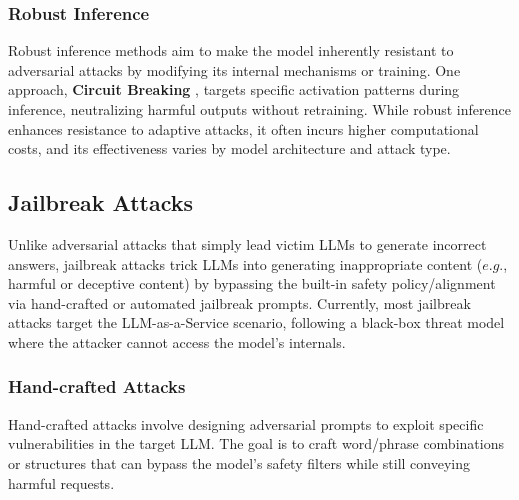 \subsubsection{Robust Inference}
Robust inference methods aim to make the model inherently resistant to adversarial attacks by modifying its internal mechanisms or training. One approach, \textbf{Circuit Breaking} \cite{zou2024improving}, targets specific activation patterns during inference, neutralizing harmful outputs without retraining. While robust inference enhances resistance to adaptive attacks, it often incurs higher computational costs, and its effectiveness varies by model architecture and attack type.

\subsection{Jailbreak Attacks}
\label{sec:llm_jailbreak_attacks}


Unlike adversarial attacks that simply lead victim LLMs to generate incorrect answers, jailbreak attacks trick LLMs into generating inappropriate content ($e.g.$, harmful or deceptive content) by bypassing the built-in safety policy/alignment via hand-crafted or automated jailbreak prompts.
Currently, most jailbreak attacks target the LLM-as-a-Service scenario, following a black-box threat model where the attacker cannot access the model’s internals.


\subsubsection{Hand-crafted Attacks}

Hand-crafted attacks involve designing adversarial prompts to exploit specific vulnerabilities in the target LLM. The goal is to craft word/phrase combinations or structures that can bypass the model's safety filters while still conveying harmful requests.

